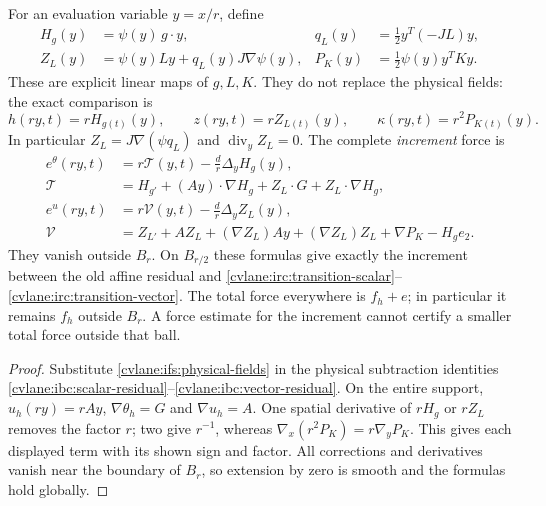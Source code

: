 For an evaluation variable $y=x/r$, define
\begin{align}
 H_g(y)&=\psi(y)\,g\cdot y,&
 q_L(y)&=\tfrac12 y^T(-JL)y,\nonumber\\
 Z_L(y)&=\psi(y)Ly+q_L(y)J\nabla\psi(y),&
 P_K(y)&=\tfrac12\psi(y)y^TKy.
 \label{cvlane:ifs:cutoff-maps}
\end{align}
These are explicit linear maps of $g,L,K$.  They do not replace the
physical fields: the exact comparison is
\begin{equation}\label{cvlane:ifs:physical-fields}
 h(ry,t)=rH_{g(t)}(y),\qquad
 z(ry,t)=rZ_{L(t)}(y),\qquad
 \kappa(ry,t)=r^2P_{K(t)}(y).
\end{equation}
In particular $Z_L=J\nabla(\psi q_L)$ and
$\operatorname{div}_yZ_L=0$.
The complete \emph{increment} force is
\begin{align}
 e^\theta(ry,t)
 &=r\mathcal T(y,t)-\frac d r\Delta_y H_g(y),\nonumber\\
 \mathcal T
 &=H_{g'}+(Ay)\cdot\nabla H_g
       +Z_L\cdot G+Z_L\cdot\nabla H_g,
 \label{cvlane:ifs:scalar-force}\\
 e^u(ry,t)
 &=r\mathcal V(y,t)-\frac d r\Delta_y Z_L(y),\nonumber\\
 \mathcal V
 &=Z_{L'}+AZ_L+(\nabla Z_L)Ay
       +(\nabla Z_L)Z_L+\nabla P_K-H_g e_2.
 \label{cvlane:ifs:vector-force}
\end{align}
They vanish outside $B_r$.  On $B_{r/2}$ these formulas give exactly
the increment between the old affine residual and
\eqref{cvlane:irc:transition-scalar}--\eqref{cvlane:irc:transition-vector}.
The total force everywhere is $f_h+e$; in particular it remains $f_h$
outside $B_r$.  A force estimate for the increment cannot certify a
smaller total force outside that ball.

\begin{proof}
Substitute \eqref{cvlane:ifs:physical-fields} in the physical subtraction
identities \eqref{cvlane:ibc:scalar-residual}--\eqref{cvlane:ibc:vector-residual}.
On the entire support, $u_h(ry)=rAy$,
$\nabla\theta_h=G$ and $\nabla u_h=A$.
One spatial derivative of $rH_g$ or $rZ_L$ removes the factor $r$;
two give $r^{-1}$, whereas $\nabla_x(r^2P_K)=r\nabla_yP_K$.
This gives each displayed term with its shown sign and factor.
All corrections and derivatives vanish near the boundary of $B_r$,
so extension by zero is smooth and the formulas hold globally.
\end{proof}

